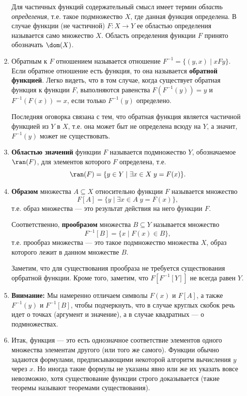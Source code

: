 \begin{enumerate}
Для частичных функций содержательный смысл имеет термин \textit{область определения}, т.е. такое подмножество $X$, где данная функция определена. В случае функции (не частичной) $F:X\to Y$ ее областью определения называется само множество $X$. Область определения функции $F$ принято обозначать $\dom(X)$.

\item Обратным к $F$ отношением называется отношение $F^{-1}=\{(y,x)\mid xFy\}$. Если обратное отношение есть функция, то она называется \textbf{обратной функцией}. Легко видеть, что в том случае, когда существует обратная функция к функции $F$, выполняются равенства $F(F^{-1}(y))=y$ и $F^{-1}(F(x))=x$, если только $F^{-1}(y)$ определено.

Последняя оговорка связана с тем, что обратная функция является частичной функцией из $Y$ в $X$, т.е. она может быт не определена всюду на $Y$, а значит, $F^{-1}(y)$ может не существовать.

\item \textbf{Областью значений} функции $F$ называется подмножество $Y$, обозначаемое $\ran(F)$, для элементов которого $F$ определена, т.е.
$$
\ran(F) = \{y\in Y\mid\exists x\in X\;y=F(x)\}.
$$

\item \textbf{Образом} множества $A\subseteq X$ относительно функции $F$ называется множество
$$
F[A] = \{y\mid \exists x\in A\;y=F(x)\},
$$
т.е. образ множества --- это результат действия на него функции $F$.

Соответственно, \textbf{прообразом} множества $B\subseteq Y$ называется множество
$$
F^{-1}[B] = \{x\mid F(x)\in B\},
$$
т.е. прообраз множества --- это такое подмножество множества $X$, образ которого лежит в данном множестве $B$. 

Заметим, что для существования прообраза не требуется существования орбратной функции. Кроме того, заметим, что $F[F^{-1}[Y]]$ не всегда равен $Y$.

\item \textbf{Внимание:} Мы намеренно отличаем символы $F(x)$ и $F[A]$, а также $F^{-1}(y)$ и $F^{-1}[B]$, чтобы подчеркнуть, что в случае круглых скобок речь идет о точках (аргумент и значение), а в случае квадратных --- о подмножествах.

\item Итак, функция --- это есть однозначное соответствие элементов одного множества элементам другого (или того же самого). Функции обычно задаются формулами, предписывающими некоторой алгоритм вычисления $y$ через $x$. Но иногда такие формулы не указаны явно или же их указать вовсе невозможно, хотя существование функции строго доказывается (такие теоремы называют теоремами существования).
\end{enumerate}

